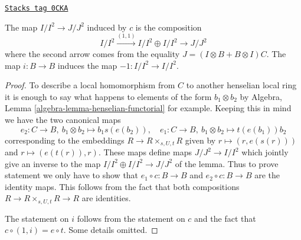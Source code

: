 \begin{lemma}
\label{spaces-more-groupoids-lemma-first-order-structure-c}
\href{https://stacks.math.columbia.edu/tag/0CKA}{\texttt{Stacks tag 0CKA}}

The map $I/I^2 \to J/J^2$ induced by $c$ is the composition
$$
I/I^2 \xrightarrow{(1, 1)} I/I^2 \oplus I/I^2 \to J/J^2
$$
where the second arrow comes from the equality
$J = (I \otimes B + B \otimes I)C$.
The map $i : B \to B$ induces the map $-1 : I/I^2 \to I/I^2$.
\end{lemma}

\begin{proof}
To describe a local homomorphism from $C$ to another
henselian local ring it is enough to say what happens
to elements of the form $b_1 \otimes b_2$ by
Algebra, Lemma \ref{algebra-lemma-henselian-functorial}
for example. Keeping this in mind we have the two canonical maps
$$
e_2 : C \to B,\ b_1 \otimes b_2 \mapsto b_1s(e(b_2)),\quad
e_1 : C \to B,\ b_1 \otimes b_2 \mapsto t(e(b_1))b_2
$$
corresponding to the embeddings
$R \to R \times_{s, U, t} R$ given by
$r \mapsto (r, e(s(r)))$ and $r \mapsto (e(t(r)), r)$.
These maps define maps $J/J^2 \to I/I^2$ which jointly
give an inverse to the map $I/I^2 \oplus I/I^2 \to J/J^2$
of the lemma. Thus to prove statement we only have to show
that $e_1 \circ c : B \to B$ and $e_2 \circ c : B \to B$
are the identity maps. This follows from the fact that both
compositions $R \to R \times_{s, U, t} R \to R$ are identities.

\medskip\noindent
The statement on $i$ follows from the statement on $c$ and the
fact that $c \circ (1, i) = e \circ t$. Some details omitted.
\end{proof}

